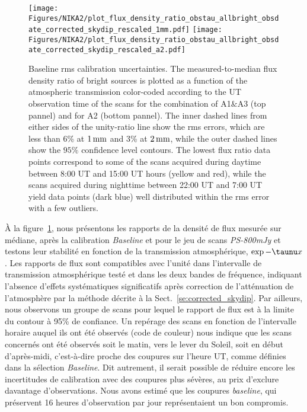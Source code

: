 \begin{figure}[!thbp]
  \begin{center}
    \texttt{[image: Figures/NIKA2/plot\_flux\_density\_ratio\_obstau\_allbright\_obsdate\_corrected\_skydip\_rescaled\_1mm.pdf]}
    \hfill
    \texttt{[image: Figures/NIKA2/plot\_flux\_density\_ratio\_obstau\_allbright\_obsdate\_corrected\_skydip\_rescaled\_a2.pdf]} 
    \caption[Baseline calibration rms error estimate]{Baseline
      rms calibration uncertainties. The
      measured-to-median flux density ratio of bright sources is
      plotted as a function of the atmospheric transmission
      color-coded according to the UT
      observation time of the scans for the combination of A1$\&$A3
      (top pannel)
      and for A2 (bottom pannel).
      The inner dashed lines from either sides of the
      unity-ratio line show the rms errors, which
      are less than 6\% at $1\,\rm{mm}$ and 3\% at $2\,\rm{mm}$, while
      the outer dashed lines show the $95\%$ confidence level contours.
      The lowest flux ratio data points correspond to some of the
      scans acquired during daytime between 8:00 UT and 15:00 UT
      hours (yellow and red), while the scans acquired during nighttime
      between 22:00 UT and 7:00 UT yield data points (dark blue)
      well distributed within the rms error with a few outliers.}
    \label{fig:allbright_rms_corrected_skydip}
  \end{center}
\end{figure}
%
\`A la figure~\ref{fig:allbright_rms_corrected_skydip}, nous
présentons les rapports de la densité de flux mesurée sur médiane,
après la calibration \emph{Baseline} et pour
le jeu de scans \emph{PS-800mJy} et testons leur stabilité en
fonction de la transmission atmosphérique, $\exp{-\taunu x}$. Les
rapports de flux sont compatibles avec l'unité  dans l'intervalle de
transmission atmosphérique testé et dans les deux bandes de fréquence,
indiquant l'absence d'effets systématiques significatifs après
correction de l'atténuation de l'atmosphère par la méthode décrite à
la Sect.~\ref{se:corrected_skydip}. Par ailleurs, nous observons un
groupe de scans pour lequel le rapport de flux est à la limite du
contour à 95\% de confiance. Un repérage des scans en fonction de
l'intervalle horaire auquel ils ont été observés (code de couleur)
nous indique que les scans concernés ont été observés soit le matin,
vers le lever du Soleil, soit en début d'après-midi, c'est-à-dire
proche des coupures sur l'heure UT, comme définies dans la sélection
\emph{Baseline}. Dit autrement, il serait possible de réduire encore
les incertitudes de calibration avec des coupures plus sévères, au
prix d'exclure davantage d'observations. Nous avons estimé que les
coupures \emph{baseline}, qui préservent 16 heures d'observation par
jour représentaient un bon compromis.

